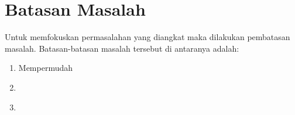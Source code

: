 \section{Batasan Masalah}
\label{sec:batasanmasalah}

Untuk memfokuskan permasalahan yang diangkat maka dilakukan pembatasan masalah.
Batasan-batasan masalah tersebut di antaranya adalah:

\begin{enumerate}[nolistsep]

  \item Mempermudah \textcolor{red}{\lipsum[1][1-3]}

  \item \textcolor{red}{\lipsum[2][1-2]}

  \item \textcolor{red}{\lipsum[3][1-2]}

\end{enumerate}
